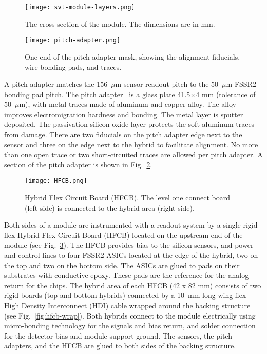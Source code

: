 \begin{figure}[hbt] 
\centering 
\texttt{[image: svt-module-layers.png]}
\caption{The cross-section of the module. The dimensions are in mm.}
\label{fig:svt-module-layers}
\end{figure}

\begin{figure}[hbt] 
\centering 
\texttt{[image: pitch-adapter.png]}
\caption{One end of the pitch adapter mask, showing the alignment fiducials, wire bonding pads, and traces.}
\label{fig:pitch-adapter}
\end{figure}

A pitch adapter matches the 156~$\mu$m sensor readout pitch to the 50~$\mu$m FSSR2 bonding pad pitch. The pitch adapter~\cite{PA} is a glass plate 41.5$\times$4 mm (tolerance of 50~$\mu$m), with metal traces made of aluminum and copper alloy. The alloy improves electromigration hardness and bonding. The metal layer is sputter deposited. The passivation silicon oxide layer protects the soft aluminum traces from damage. There are two fiducials on the pitch adapter edge next to the sensor and three on the edge next to the hybrid to facilitate alignment. No more than one open trace or two short-circuited traces are allowed per pitch adapter. A section of the pitch adapter is shown in Fig.~\ref{fig:pitch-adapter}. 

\begin{figure}[hbt] 
\centering 
\texttt{[image: HFCB.png]}
\caption{Hybrid Flex Circuit Board (HFCB). The level one connect board (left side) is connected to the hybrid area (right side).}
\label{fig:HFCB}
\end{figure}

Both sides of a module are instrumented with a readout system by a single rigid-flex Hybrid Flex Circuit Board (HFCB) located on the upstream end of the module (see Fig.~\ref{fig:HFCB}). The HFCB provides bias to the silicon sensors, and power and control lines to four FSSR2 ASICs located at the edge of the hybrid, two on the top and two on the bottom side. The ASICs are glued to pads on their substrates with conductive epoxy. These pads are the reference for the analog return for the chips. The hybrid area of each HFCB (42 x 82 mm) consists of two rigid boards (top and bottom hybrids) connected by a 10~mm-long wing flex High Density Interconnect (HDI) cable wrapped around the backing structure (see Fig.~\ref{fig:hfcb-wrap}). Both hybrids connect to the module electrically using micro-bonding technology for the signals and bias return, and solder connection for the detector bias and module support ground. The sensors, the pitch adapters, and the HFCB are glued to both sides of the backing structure. 

